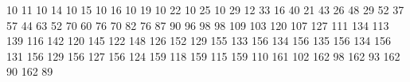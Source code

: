 10 11
10 14
10 15
10 16
10 19
10 22
10 25
10 29
12 33
16 40
21 43
26 48
29 52
37 57
44 63
52 70
60 76
70 82
76 87
90 96
98 98
109 103
120 107
127 111
134 113
139 116
142 120
145 122
148 126
152 129
155 133
156 134
156 135
156 134
156 131
156 129
156 127
156 124
159 118
159 115
159 110
161 102
162 98
162 93
162 90
162 89
